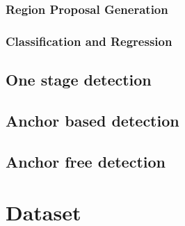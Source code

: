 \subsubsection{Region Proposal Generation}
\subsubsection{Classification and Regression}
\subsection{One stage detection}
\subsection{Anchor based detection}
\subsection{Anchor free detection}
\section{Dataset}